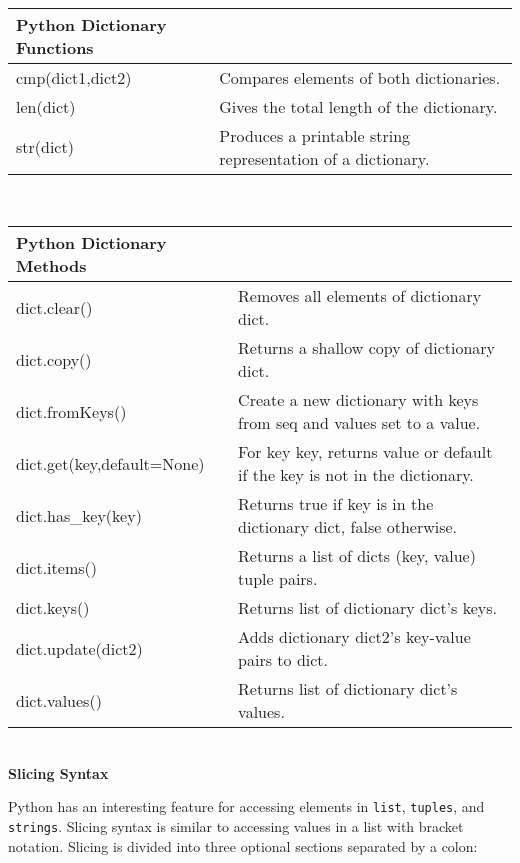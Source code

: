 \documentclass[letterpaper,11pt]{article}
\begin{document}
\\
\begin{tabular}[t]{l l}
    \textbf{Python Dictionary Functions}  \\
    \hline
    cmp(dict1,dict2) & Compares elements of both dictionaries.                    \\
    len(dict)        & Gives the total length of the dictionary.                  \\
    str(dict)        & Produces a printable string representation of a dictionary. \\
\end{tabular}
\\
\begin{tabular}[t]{l l}\setlength{\tabcolsep}{10pt}
    \textbf{Python Dictionary Methods}  \\
    \hline
    dict.clear()               & Removes all elements of dictionary dict.                                   \\
    dict.copy()                & Returns a shallow copy of dictionary dict.                                 \\
    dict.fromKeys()            & Create a new dictionary with keys from seq and values set to a value.      \\
    dict.get(key,default=None) & For key key, returns value or default if the key is not in the dictionary. \\
    dict.has\_key(key)         & Returns true if key is in the dictionary dict, false otherwise.            \\
    dict.items()               & Returns a list of dicts (key, value) tuple pairs.                          \\
    dict.keys()                & Returns list of dictionary dict's keys.                                    \\
    dict.update(dict2)         & Adds dictionary dict2's key-value pairs to dict.                           \\
    dict.values()              & Returns list of dictionary dict's values.                                  \\
\end{tabular}
\\
\textbf{Slicing Syntax}
\par{Python has an interesting feature for accessing elements in \texttt{list},
\texttt{tuples}, and \texttt{strings}. Slicing syntax is similar to accessing
values in a list with bracket notation. Slicing is divided into three optional
sections separated by a colon:}
\end{document}
